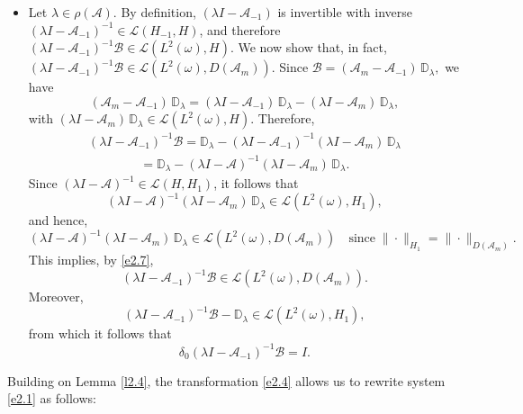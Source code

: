 \documentclass[10pt, a4]{amsart}
\makeatletter
\theoremstyle{plain}
\theoremstyle{definition}
\theoremstyle{remark}
\renewenvironment{proof}[1][\proofname]{\par
  \pushQED{\qed}%
  \normalfont \topsep6\p@\@plus6\p@\relax
  \trivlist
  \item[\hskip\labelsep
        \itshape
    #1\ \ref{#1}.]\ignorespaces
}{%
  \popQED\endtrivlist\@endpefalse
}
\numberwithin{equation}{section}
\makeatother
\begin{document}
\begin{proof}[of Lemma \ref{l2.4}]
\begin{itemize}
\item[2.] Let \(\lambda \in \rho(\mathcal{A})\). By definition, \((\lambda I - \mathcal{A}_{-1})\) is invertible with inverse \((\lambda I - \mathcal{A}_{-1})^{-1} \in \mathcal{L}(H_{-1}, H)\), and therefore \((\lambda I - \mathcal{A}_{-1})^{-1}\mathcal{B} \in \mathcal{L}(L^2(\omega), H)\). We now show that, in fact, \((\lambda I - \mathcal{A}_{-1})^{-1}\mathcal{B} \in \mathcal{L}(L^2(\omega), D(\mathcal{A}_m))\). Since $\mathcal{B} = (\mathcal{A}_m - \mathcal{A}_{-1})\,\mathbb{D}_{\lambda},
$
we have
\[
(\mathcal{A}_m - \mathcal{A}_{-1})\,\mathbb{D}_{\lambda} = (\lambda I - \mathcal{A}_{-1})\,\mathbb{D}_{\lambda} - (\lambda I - \mathcal{A}_m)\,\mathbb{D}_{\lambda},
\]
with \((\lambda I - \mathcal{A}_m)\,\mathbb{D}_{\lambda} \in \mathcal{L}(L^2(\omega), H)\). Therefore,
\begin{align}\label{e2.7}
(\lambda I - \mathcal{A}_{-1})^{-1}\mathcal{B} = \mathbb{D}_{\lambda} - (\lambda I - \mathcal{A}_{-1})^{-1}(\lambda I - \mathcal{A}_m)\,\mathbb{D}_{\lambda}    
\end{align}
\begin{align*}
    = \mathbb{D}_{\lambda} - (\lambda I - \mathcal{A})^{-1}(\lambda I - \mathcal{A}_m)\,\mathbb{D}_{\lambda}.
\end{align*}
Since \((\lambda I - \mathcal{A})^{-1} \in \mathcal{L}(H, H_1)\), it follows that
\[
(\lambda I - \mathcal{A})^{-1}(\lambda I - \mathcal{A}_m)\,\mathbb{D}_{\lambda} \in \mathcal{L}(L^2(\omega), H_1),
\]
and hence,
\[
(\lambda I - \mathcal{A})^{-1}(\lambda I - \mathcal{A}_m)\,\mathbb{D}_{\lambda} \in \mathcal{L}(L^2(\omega), D(\mathcal{A}_m))\quad\text{since}\; \|\cdot\|_{H_1} = \|\cdot\|_{D(\mathcal{A}_m)}.
\]
This implies, by \eqref{e2.7},
\[
(\lambda I - \mathcal{A}_{-1})^{-1}\mathcal{B} \in \mathcal{L}(L^2(\omega), D(\mathcal{A}_m)).
\]
Moreover, 
\[
(\lambda I - \mathcal{A}_{-1})^{-1}\mathcal{B} - \mathbb{D}_{\lambda} \in \mathcal{L}(L^2(\omega), H_1),
\]
from which it follows that
\[
\delta_0(\lambda I - \mathcal{A}_{-1})^{-1}\mathcal{B} = I.
\]
\end{itemize}
\end{proof} 
Building on Lemma \ref{l2.4}, the transformation \eqref{e2.4} allows us to rewrite system \eqref{e2.1} as follows:
\end{document}
